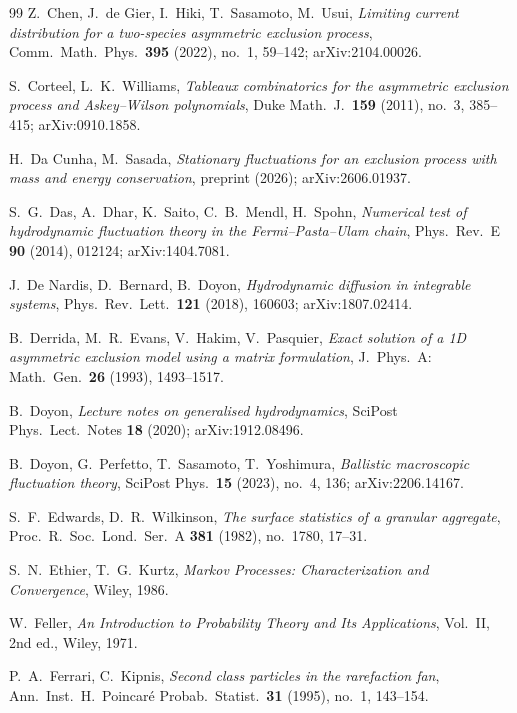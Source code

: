 \begin{thebibliography}{99}
 Z.~Chen, J.~de Gier, I.~Hiki, T.~Sasamoto, M.~Usui, \emph{Limiting
current distribution for a two-species asymmetric exclusion process},
Comm.~Math.~Phys.~\textbf{395} (2022), no.~1, 59--142; arXiv:2104.00026.

 S.~Corteel, L.~K.~Williams, \emph{Tableaux combinatorics
for the asymmetric exclusion process and Askey--Wilson polynomials}, Duke
Math.~J.~\textbf{159} (2011), no.~3, 385--415; arXiv:0910.1858.

 H.~Da Cunha, M.~Sasada, \emph{Stationary fluctuations for an
exclusion process with mass and energy conservation}, preprint (2026); arXiv:2606.01937.

 S.~G.~Das, A.~Dhar, K.~Saito, C.~B.~Mendl, H.~Spohn, \emph{Numerical
test of hydrodynamic fluctuation theory in the Fermi--Pasta--Ulam chain},
Phys.~Rev.~E \textbf{90} (2014), 012124; arXiv:1404.7081.

 J.~De Nardis, D.~Bernard, B.~Doyon, \emph{Hydrodynamic diffusion in
integrable systems}, Phys.~Rev.~Lett.~\textbf{121} (2018), 160603; arXiv:1807.02414.

 B.~Derrida, M.~R.~Evans, V.~Hakim, V.~Pasquier, \emph{Exact solution
of a 1D asymmetric exclusion model using a matrix formulation}, J.~Phys.~A:
Math.~Gen.~\textbf{26} (1993), 1493--1517.

 B.~Doyon, \emph{Lecture notes on generalised hydrodynamics},
SciPost Phys.~Lect.~Notes \textbf{18} (2020); arXiv:1912.08496.

 B.~Doyon, G.~Perfetto, T.~Sasamoto, T.~Yoshimura, \emph{Ballistic
macroscopic fluctuation theory}, SciPost Phys.~\textbf{15} (2023), no.~4, 136;
arXiv:2206.14167.

 S.~F.~Edwards, D.~R.~Wilkinson, \emph{The surface statistics of a granular
aggregate}, Proc.~R.~Soc.~Lond.~Ser.~A \textbf{381} (1982), no.~1780, 17--31.

 S.~N.~Ethier, T.~G.~Kurtz, \emph{Markov Processes: Characterization and
Convergence}, Wiley, 1986.

 W.~Feller, \emph{An Introduction to Probability Theory and Its
Applications}, Vol.~II, 2nd ed., Wiley, 1971.

 P.~A.~Ferrari, C.~Kipnis, \emph{Second class particles in
the rarefaction fan}, Ann.~Inst.~H.~Poincar\'e Probab.~Statist.~\textbf{31}
(1995), no.~1, 143--154.


\end{thebibliography}
